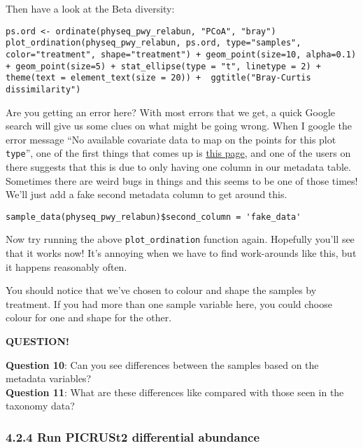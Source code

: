 \documentclass[
]{book}
\newenvironment{bluebox}{
  \definecolor{shadecolor}{RGB}{172, 210, 237}
  \color{white}
  \begin{shaded}}
 {\end{shaded}}
\begin{document}
Then have a look at the Beta diversity:

\begin{verbatim}
ps.ord <- ordinate(physeq_pwy_relabun, "PCoA", "bray")
plot_ordination(physeq_pwy_relabun, ps.ord, type="samples", color="treatment", shape="treatment") + geom_point(size=10, alpha=0.1) + geom_point(size=5) + stat_ellipse(type = "t", linetype = 2) + theme(text = element_text(size = 20)) +  ggtitle("Bray-Curtis dissimilarity")
\end{verbatim}

Are you getting an error here? With most errors that we get, a quick Google search will give us some clues on what might be going wrong. When I google the error message ``No available covariate data to map on the points for this plot \texttt{type}'', one of the first things that comes up is \href{https://github.com/joey711/phyloseq/issues/541}{this page}, and one of the users on there suggests that this is due to only having one column in our metadata table. Sometimes there are weird bugs in things and this seems to be one of those times! We'll just add a fake second metadata column to get around this.

\begin{verbatim}
sample_data(physeq_pwy_relabun)$second_column = 'fake_data'
\end{verbatim}

Now try running the above \texttt{plot\_ordination} function again. Hopefully you'll see that it works now! It's annoying when we have to find work-arounds like this, but it happens reasonably often.

You should notice that we've chosen to colour and shape the samples by treatment. If you had more than one sample variable here, you could choose colour for one and shape for the other.

\begin{bluebox}

\begin{center}
\textbf{QUESTION!}

\end{center}

\textbf{Question 10}: Can you see differences between the samples based on the metadata variables?\\
\textbf{Question 11}: What are these differences like compared with those seen in the taxonomy data?

\end{bluebox}

\subsubsection{4.2.4 Run PICRUSt2 differential abundance}\label{run-picrust2-differential-abundance}
\end{document}
